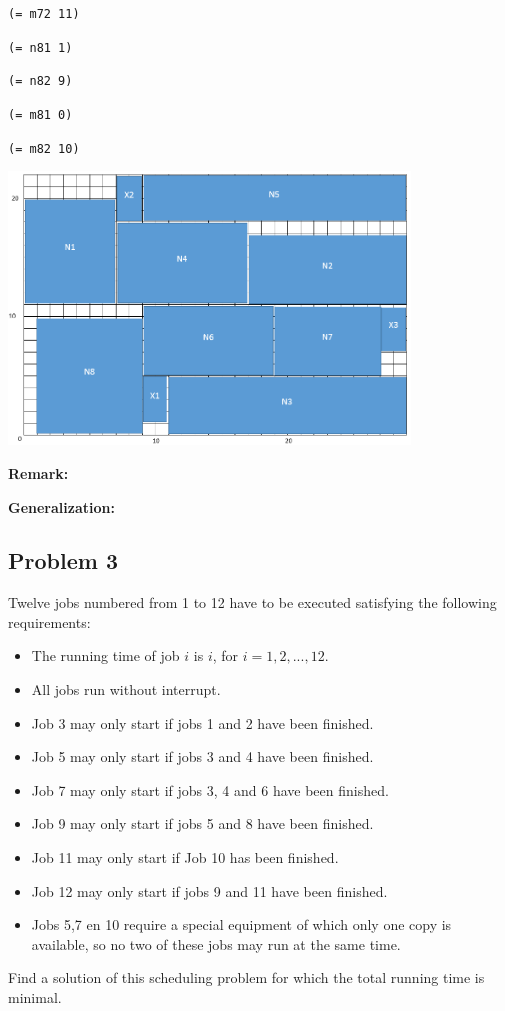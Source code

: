 \documentclass[11pt]{article}
\begin{document}
{{{\tt(= m72 11)}

{\tt(= n81 1)}

{\tt(= n82 9)}

{\tt(= m81 0)}

{\tt(= m82 10)}

}

\begin{center}
\includegraphics[width=0.8\textwidth]{Part1_2_3.png}
\end{center}

\vspace{3mm}

{\bf Remark:}

\vspace{3mm}

{\bf Generalization:}

\vspace{5mm}

\subsection*{Problem 3}

Twelve jobs numbered from 1 to 12 have to be executed satisfying the following requirements:
\begin{itemize}
  \item The running time of job $i$ is $i$, for $i = 1, 2, . . . , 12$.
  \item All jobs run without interrupt.
  \item Job 3 may only start if jobs 1 and 2 have been finished.
  \item Job 5 may only start if jobs 3 and 4 have been finished.
  \item Job 7 may only start if jobs 3, 4 and 6 have been finished.
  \item Job 9 may only start if jobs 5 and 8 have been finished.
  \item Job 11 may only start if Job 10 has been finished.
  \item Job 12 may only start if jobs 9 and 11 have been finished.
  \item Jobs 5,7 en 10 require a special equipment of which only one copy is available, so no two of these jobs may run at the same time.
\end{itemize}
Find a solution of this scheduling problem for which the total running time is minimal.

}
\end{document}
